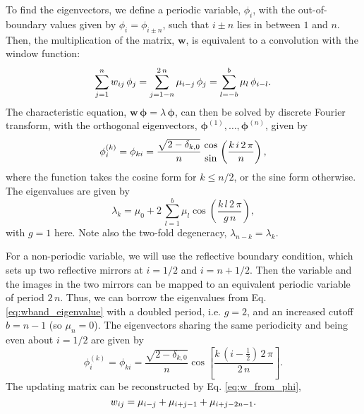 \documentclass[preprint, superscriptaddress, floatfix]{revtex4-1}
\begin{document}
To find the eigenvectors,
we define a periodic variable, $\phi_i$,
with the out-of-boundary values given by
$\phi_i = \phi_{i \pm n}$,
%
such that $i \pm n$ lies in between $1$ and $n$.
%
Then, the multiplication of the matrix, $\mathbf w$,
is equivalent to a convolution with the window function:
%
\begin{equation}
  \sum_{ j = 1 }^n
    w_{ij} \, \phi_j
  =
  \sum_{ j = 1 - n }^{ 2 \, n }
    \mu_{i - j} \, \phi_j
  =
  \sum_{ l = -b }^{ b }
    \mu_l \, \phi_{ i - l}
  .
  \notag
\end{equation}
%
The characteristic equation,
$\mathbf w \, \pmb\phi = \lambda \, \pmb\phi$,
can then be solved by discrete Fourier transform,
with the orthogonal eigenvectors,
$\pmb\phi^{(1)}, \dots, \pmb\phi^{(n)}$,
given by
%
\begin{equation}
  \phi^{(k)}_i
  =
  \phi_{ki}
  =
  \frac{ \sqrt{ 2 - \delta_{k,0} } } { n }
  \,
  {\cos \atop \sin}
  \left(
    \frac{ k \, i \, 2 \, \pi }
         {      n             }
  \right)
  ,
  \notag
\end{equation}
%
where the function takes the cosine form for $k \le n/2$,
or the sine form otherwise.
%
The eigenvalues are given by
\begin{equation}
  \lambda_k
  =
  \mu_0
  +
  2 \,
  \sum_{ l = 1 }^b
  \mu_l
  \cos\left(
  \frac{ k \, l \, 2 \, \pi }
       {      g \, n        }
  \right)
  ,
  \label{eq:wband_eigenvalue}
\end{equation}
%
with $g = 1$ here.
Note also the two-fold degeneracy,
  $\lambda_{n - k} = \lambda_k$.


For a non-periodic variable,
we will use the reflective boundary condition\cite{bussi2006},
which sets up two reflective mirrors at
$i = 1/2$ and $i = n + 1/2$.
%
Then the variable and the images in the two mirrors
can be mapped to an equivalent periodic variable of period $2 \, n$.
%
Thus, we can borrow the eigenvalues from
Eq. \eqref{eq:wband_eigenvalue}
with a doubled period, i.e. $g = 2$,
and an increased cutoff $b = n - 1$
(so $\mu_n = 0$).
%
The eigenvectors sharing the same periodicity
and being even about $i = 1/2$ are given by
%
\begin{equation}
  \phi^{(k)}_i
  =
  \phi_{k i}
  =
  \frac{ \sqrt{ 2 - \delta_{k, 0} } }
       {             n              }
  \cos \left[
       \frac{ k \, \left( i - \frac 1 2 \right) \, 2 \, \pi}
            {             2 \, n                           }
       \right]
  .
  \label{eq:wband_eigenvector_refl}
\end{equation}
%
The updating matrix can be reconstructed
by Eq. \eqref{eq:w_from_phi},
%
%
\begin{equation}
  w_{ij}
  =
  \mu_{ i - j }
  +
  \mu_{ i + j - 1 }
  +
  \mu_{ i + j - 2 n - 1 }
  .
  \notag
\end{equation}
%
\end{document}
